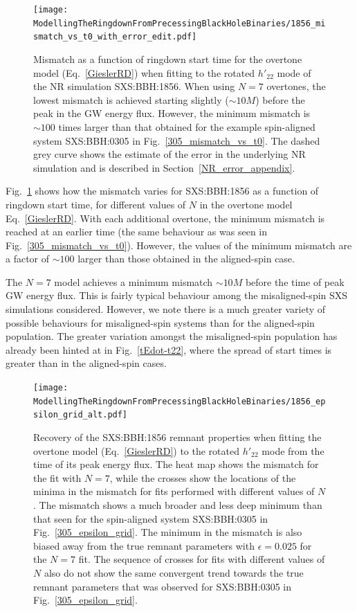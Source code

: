 \begin{figure}[t]
    \centering
    \texttt{[image: ModellingTheRingdownFromPrecessingBlackHoleBinaries/1856\_mismatch\_vs\_t0\_with\_error\_edit.pdf]}
    \caption[Mismatch for the overtone model fitted to SXS:BBH:1856]{
    Mismatch as a function of ringdown start time for the overtone model (Eq.~\ref{GieslerRD}) when fitting to the rotated $h'_{22}$ mode of the NR simulation SXS:BBH:1856.
    When using $N=7$ overtones, the lowest mismatch is achieved starting slightly ($\sim 10M$) before the peak in the GW energy flux.
    However, the minimum mismatch is $\sim 100$ times larger than that obtained for the example spin-aligned system SXS:BBH:0305 in Fig.~\ref{305_mismatch_vs_t0}. 
    The dashed grey curve shows the estimate of the error in the underlying NR simulation and is described in Section~\ref{NR_error_appendix}.
    }
    \label{1856_mismatch_vs_t0}
\end{figure}

Fig.~\ref{1856_mismatch_vs_t0} shows how the mismatch varies for SXS:BBH:1856 as a function of ringdown start time, for different values of $N$ in the overtone model Eq.~\ref{GieslerRD}.
With each additional overtone, the minimum mismatch is reached at an earlier time (the same behaviour as was seen in Fig.~\ref{305_mismatch_vs_t0}).
However, the values of the minimum mismatch are a factor of $\sim 100$ larger than those obtained in the aligned-spin case. 

The $N=7$ model achieves a minimum mismatch $\sim 10M$ before the time of peak GW energy flux. This is fairly typical behaviour among the misaligned-spin SXS simulations considered.
However, we note there is a much greater variety of possible behaviours for misaligned-spin systems than for the aligned-spin population. 
The greater variation amongst the misaligned-spin population has already been hinted at in Fig.~\ref{tEdot-t22}, where the spread of start times is greater than in the aligned-spin cases.

\begin{figure}[t]
    \centering
    \texttt{[image: ModellingTheRingdownFromPrecessingBlackHoleBinaries/1856\_epsilon\_grid\_alt.pdf]}
    \caption[Recovery of SXS:BBH:1856 remnant properties using the overtone model]{
    Recovery of the SXS:BBH:1856 remnant properties when fitting the overtone model (Eq.~\ref{GieslerRD}) to the rotated $h'_{22}$ mode from the time of its peak energy flux.
    The heat map shows the mismatch for the fit with $N=7$, while the crosses show the locations of the minima in the mismatch for fits performed with different values of $N$.
    The mismatch shows a much broader and less deep minimum than that seen for the spin-aligned system SXS:BBH:0305 in Fig.~\ref{305_epsilon_grid}.
    The minimum in the mismatch is also biased away from the true remnant parameters with $\epsilon=0.025$ for the $N=7$ fit.
    The sequence of crosses for fits with different values of $N$ also do not show the same convergent trend towards the true remnant parameters that was observed for SXS:BBH:0305 in Fig.~\ref{305_epsilon_grid}.
    }
    \label{1856_epsilon_grid}
\end{figure}

